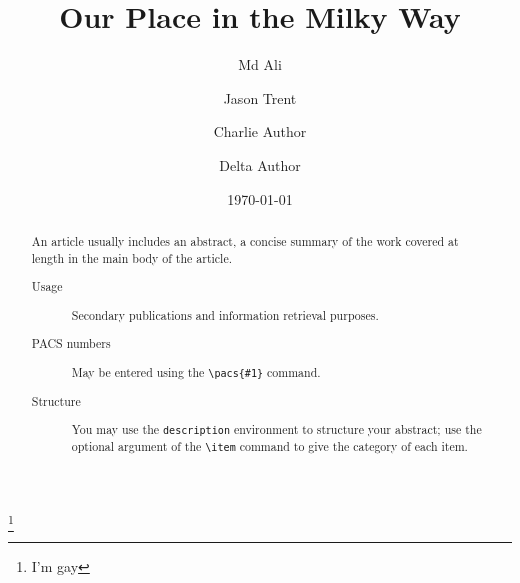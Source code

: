 
\title{Our Place in the Milky Way}%
\thanks{I'm gay}%

\author{Md Ali}
\author{Jason Trent}%
%


\author{Charlie Author}
%
%
\author{Delta Author}
%


\date{\today}%

\begin{abstract}
An article usually includes an abstract, a concise summary of the work
covered at length in the main body of the article. 
\begin{description}
\item[Usage]
Secondary publications and information retrieval purposes.
\item[PACS numbers]
May be entered using the \verb+\pacs{#1}+ command.
\item[Structure]
You may use the \texttt{description} environment to structure your abstract;
use the optional argument of the \verb+\item+ command to give the category of each item. 
\end{description}
\end{abstract}

\maketitle

